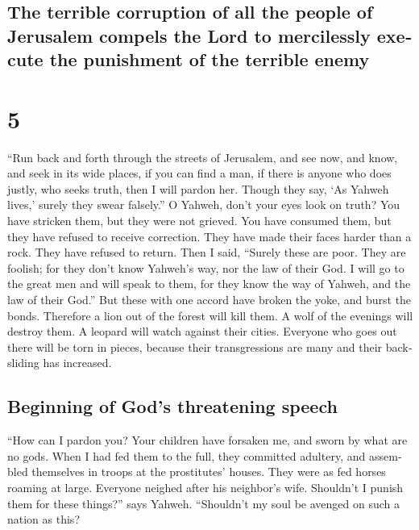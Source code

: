 \begin{paracol}{2}
\begin{otherlanguage}{english}
\hypertarget{the-terrible-corruption-of-all-the-people-of-jerusalem-compels-the-lord-to-mercilessly-execute-the-punishment-of-the-terrible-enemy}{%
\subsection{The terrible corruption of all the people of Jerusalem
compels the Lord to mercilessly execute the punishment of the terrible
enemy}\label{the-terrible-corruption-of-all-the-people-of-jerusalem-compels-the-lord-to-mercilessly-execute-the-punishment-of-the-terrible-enemy}}

\hypertarget{section-9}{%
\section{5}\label{section-9}}

 ``Run back and forth through the streets of Jerusalem,
and see now, and know, and seek in its wide places, if you can find a
man, if there is anyone who does justly, who seeks truth, then I will
pardon her.  Though they say, `As Yahweh lives,' surely
they swear falsely.''  O Yahweh, don't your eyes look on
truth? You have stricken them, but they were not grieved. You have
consumed them, but they have refused to receive correction. They have
made their faces harder than a rock. They have refused to return.
 Then I said, ``Surely these are poor. They are foolish;
for they don't know Yahweh's way, nor the law of their God.
 I will go to the great men and will speak to them, for
they know the way of Yahweh, and the law of their God.'' But these with
one accord have broken the yoke, and burst the bonds. 
Therefore a lion out of the forest will kill them. A wolf of the
evenings will destroy them. A leopard will watch against their cities.
Everyone who goes out there will be torn in pieces, because their
transgressions are many and their backsliding has increased.

\hypertarget{beginning-of-gods-threatening-speech}{%
\subsection{Beginning of God's threatening
speech}\label{beginning-of-gods-threatening-speech}}

 ``How can I pardon you? Your children have forsaken me,
and sworn by what are no gods. When I had fed them to the full, they
committed adultery, and assembled themselves in troops at the
prostitutes' houses.  They were as fed horses roaming at
large. Everyone neighed after his neighbor's wife. 
Shouldn't I punish them for these things?'' says Yahweh. ``Shouldn't my
soul be avenged on such a nation as this?


\end{otherlanguage}
\end{paracol}
